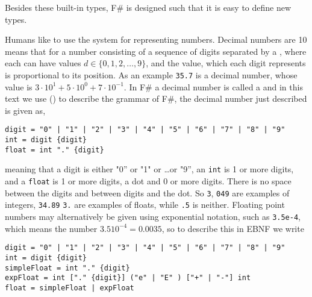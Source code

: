 Besides these built-in types, F\# is designed such that it is easy to define new types. 

Humans like to use the  system for representing numbers. Decimal numbers are  10 means that for a number consisting of a sequence of digits separated by a , where each  can have values $d \in \{0,1,2,\ldots,9\}$, and the value, which each digit represents is proportional to its position. As an example \lstinline!35.7! is a decimal number, whose value is $3\cdot 10^1+5\cdot 10^0+7\cdot 10^{-1}$. In F\# a decimal number is called a  and in this text we use  () to describe the grammar of F\#, the decimal number just described is given as,
%
\begin{lstlisting}[language=EBNF]
digit = "0" | "1" | "2" | "3" | "4" | "5" | "6" | "7" | "8" | "9"
int = digit {digit}
float = int "." {digit}
\end{lstlisting}
%
meaning that a digit is either "0'' or "1" or \dots or "9'', an \lstinline!int! is 1 or more digits, and a \lstinline!float! is 1 or more digits, a dot and 0 or more digits. There is no space between the digits and between digits and the dot. So \lstinline!3!, \lstinline!049! are examples of integers, \lstinline!34.89! \lstinline!3.! are examples of floats, while \lstinline!.5! is neither.  Floating point numbers may alternatively be given using exponential notation, such as \lstinline!3.5e-4!, which means the number $3.5 10^{-4} = 0.0035$, so to describe this in EBNF we write
%
\begin{lstlisting}[language=EBNF]
digit = "0" | "1" | "2" | "3" | "4" | "5" | "6" | "7" | "8" | "9"
int = digit {digit}
simpleFloat = int "." {digit}
expFloat = int ["." {digit}] ("e" | "E" ) ["+" | "-"] int
float = simpleFloat | expFloat
\end{lstlisting}
%

